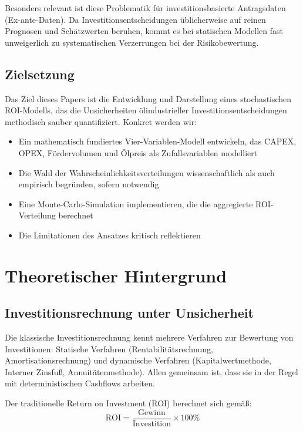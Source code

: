 \documentclass[11pt,a4paper]{article}
\begin{document}
Besonders relevant ist diese Problematik für investitionsbasierte Antragsdaten (Ex-ante-Daten). Da Investitionsentscheidungen üblicherweise auf reinen Prognosen und Schätzwerten beruhen, kommt es bei statischen Modellen fast unweigerlich zu systematischen Verzerrungen bei der Risikobewertung.

\subsection{Zielsetzung}

Das Ziel dieses Papers ist die Entwicklung und Darstellung eines stochastischen ROI-Modells, das die Unsicherheiten ölindustrieller Investitionsentscheidungen methodisch sauber quantifiziert. Konkret werden wir:

\begin{itemize}[itemsep=2pt]
  \item Ein mathematisch fundiertes Vier-Variablen-Modell entwickeln, das CAPEX, OPEX, Fördervolumen und Ölpreis als Zufallsvariablen modelliert
  \item Die Wahl der Wahrscheinlichkeitsverteilungen wissenschaftlich als auch empirisch begründen, sofern notwendig
  \item Eine Monte-Carlo-Simulation implementieren, die die aggregierte ROI-Verteilung berechnet
  \item Die Limitationen des Ansatzes kritisch reflektieren
\end{itemize}
\newpage
\section{Theoretischer Hintergrund}

\subsection{Investitionsrechnung unter Unsicherheit}

Die klassische Investitionsrechnung kennt mehrere Verfahren zur Bewertung von Investitionen: Statische Verfahren (Rentabilitätsrechnung, Amortisationsrechnung) und dynamische Verfahren (Kapitalwertmethode, Interner Zinsfuß, Annuitätenmethode). Allen gemeinsam ist, dass sie in der Regel mit deterministischen Cashflows arbeiten.

Der traditionelle Return on Investment (ROI) \cite{weber2016} berechnet sich gemäß:
\begin{equation}
\text{ROI} = \frac{\text{Gewinn}}{\text{Investition}} \times 100\%
\end{equation}
\end{document}
